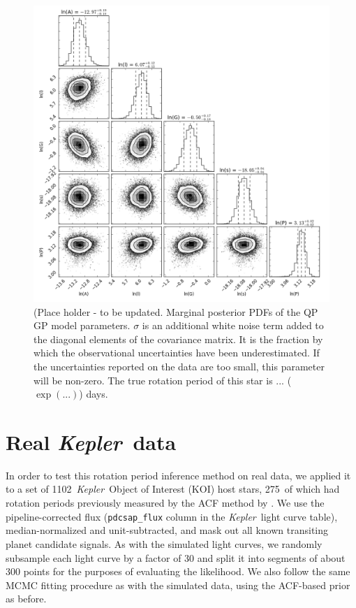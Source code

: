 \documentclass[useAMS, usenatbib, preprint, 12pt]{aastex}
\newcommand{\nkois}{1102}
\newcommand{\nkoimcq}{275}
\newcommand{\Kepler}{{\it Kepler}}
\newcommand{\kepler}{\Kepler}
\begin{document}
\begin{figure}
\begin{center}
\includegraphics[width=6in, clip=true]{figures/0002_triangle.png}
\caption{(Place holder - to be updated.
Marginal posterior PDFs of the QP GP model parameters. $\sigma$ is an
additional white noise term added to the diagonal elements of the covariance
matrix. It is the fraction by which the observational uncertainties have been
underestimated. If the uncertainties reported on the data are too small, this
parameter will be non-zero.
The true rotation period of this star is ... ($\exp(...)$) days.}
\label{fig:gp_posteriors}
\end{center}
\end{figure}

\section{Real \kepler\ data}
\label{sec:kepler}

In order to test this rotation period inference method on real data,
we applied it to a set of \nkois\ \Kepler\ Object of Interest (KOI)
host stars, \nkoimcq\ of which had rotation periods previously measured by 
the ACF method by \citet{Mcquillan2013}.  We use the pipeline-corrected flux 
(\texttt{pdcsap\_flux} column in the \Kepler\ light curve table), median-normalized
and unit-subtracted, and mask out all known transiting planet candidate signals.  
As with the simulated light curves, we randomly subsample each 
light curve by a factor of 30 and split it into segments of about 300 points
for the purposes of evaluating the likelihood.  We also follow the same MCMC
fitting procedure as with the simulated data, using the ACF-based prior as before.
\end{document}
